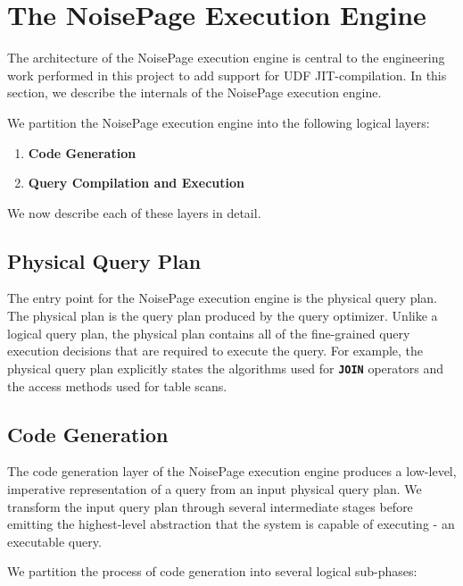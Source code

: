 \documentclass{vldb}
\newcommand{\dbSQL}[1]{\texttt{\textbf{#1}}\xspace}
\begin{document}

\section{The NoisePage Execution Engine}

The architecture of the NoisePage execution engine is central to the engineering work performed in this project to add support for UDF JIT-compilation. In this section, we describe the internals of the NoisePage execution engine.

We partition the NoisePage execution engine into the following logical layers:

\begin{enumerate}
    \item \textbf{Code Generation}
    \item \textbf{Query Compilation and Execution}
\end{enumerate}

We now describe each of these layers in detail.

\subsection{Physical Query Plan}

The entry point for the NoisePage execution engine is the physical query plan. The physical plan is the query plan produced by the query optimizer. Unlike a logical query plan, the physical plan contains all of the fine-grained query execution decisions that are required to execute the query. For example, the physical query plan explicitly states the algorithms used for \dbSQL{JOIN} operators and the access methods used for table scans.

\subsection{Code Generation}

The code generation layer of the NoisePage execution engine produces a low-level, imperative representation of a query from an input physical query plan. We transform the input query plan through several intermediate stages before emitting the highest-level abstraction that the system is capable of executing - an executable query.

We partition the process of code generation into several logical sub-phases:
\end{document}
